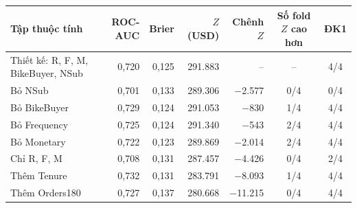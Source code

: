 \begin{tabular}{lrrrrcc}
\toprule
Tập thuộc tính & ROC-AUC & Brier & $Z$ (USD) & Chênh $Z$ & Số fold $Z$ cao hơn & ĐK1 \\
\midrule
Thiết kế: R, F, M, BikeBuyer, NSub & 0,720 & 0,125 & 291.883 & -- & -- & 4/4 \\
Bỏ NSub & 0,701 & 0,133 & 289.306 & $-$2.577 & 0/4 & 0/4 \\
Bỏ BikeBuyer & 0,729 & 0,124 & 291.053 & $-$830 & 1/4 & 4/4 \\
Bỏ Frequency & 0,725 & 0,124 & 291.340 & $-$543 & 2/4 & 4/4 \\
Bỏ Monetary & 0,722 & 0,123 & 289.869 & $-$2.014 & 2/4 & 4/4 \\
Chỉ R, F, M & 0,708 & 0,131 & 287.457 & $-$4.426 & 0/4 & 2/4 \\
Thêm Tenure & 0,732 & 0,131 & 283.791 & $-$8.093 & 1/4 & 4/4 \\
Thêm Orders180 & 0,727 & 0,137 & 280.668 & $-$11.215 & 0/4 & 4/4 \\
\bottomrule
\end{tabular}
